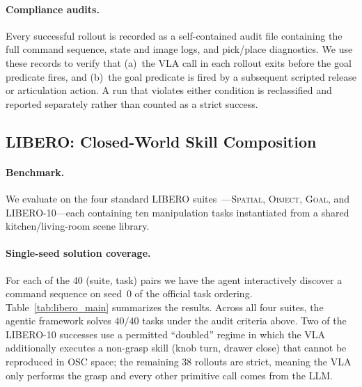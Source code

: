 \documentclass{article}
\begin{document}
	\paragraph{Compliance audits.} Every successful rollout is recorded
	as a self-contained audit file containing the full command sequence,
	state and image logs, and pick/place diagnostics. We use these
	records to verify that
	(a)~the VLA call in each rollout exits before the goal predicate
	fires, and
	(b)~the goal predicate is fired by a subsequent scripted release or
	articulation action.
	A run that violates either condition is reclassified and reported
	separately rather than counted as a strict success.

\subsection{LIBERO: Closed-World Skill Composition}
\label{sec:exp:libero}

	\paragraph{Benchmark.} We evaluate on the four standard LIBERO
	suites~\citep{Gauss1857}---\textsc{Spatial}, \textsc{Object},
	\textsc{Goal}, and \textsc{LIBERO-10}---each containing ten
	manipulation tasks instantiated from a shared kitchen/living-room
	scene library.

	\paragraph{Single-seed solution coverage.} For each of the 40
	(suite, task) pairs we have the agent interactively discover a
	command sequence on seed~0 of the official task ordering.
	Table~\ref{tab:libero_main} summarizes the results.
	Across all four suites, the agentic framework solves
	$40/40$ tasks under the audit criteria above. Two of the
	LIBERO-10 successes use a permitted ``doubled'' regime in which
	the VLA additionally executes a non-grasp skill (knob turn, drawer
	close) that cannot be reproduced in OSC space; the remaining 38
	rollouts are strict, meaning the VLA only performs the grasp and
	every other primitive call comes from the LLM.
\end{document}
